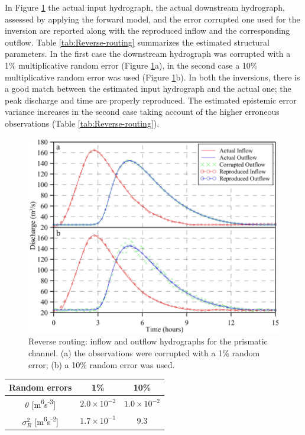 \documentclass[11pt,oneside,onecolumn]{usgsreport}
\begin{document}
\begin{appendix}
\begin{bibunit}
In Figure \ref{fig:Reverse-routing} the actual input hydrograph,
the actual downstream hydrograph, assessed by applying the forward
model, and the error corrupted one used for the inversion are reported
along with the reproduced inflow and the corresponding outflow. Table
\ref{tab:Reverse-routing} summarizes the estimated structural parameters.
In the first case the downstream hydrograph was corrupted with a 1\%
multiplicative random error (Figure \ref{fig:Reverse-routing}a),
in the second case a 10\% multiplicative random error was used (Figure
\ref{fig:Reverse-routing}b). In both the inversions, there is a good
match between the estimated input hydrograph and the actual one; the
peak discharge and time are properly reproduced. The estimated epistemic
error variance increases in the second case taking account of the
higher erroneous observations (Table \ref{tab:Reverse-routing}).

\begin{figure}[!t]
\noindent \begin{centering}
\includegraphics[scale=0.9]{figures/Reverse_Routing}
\par\end{centering}

\caption{\label{fig:Reverse-routing}Reverse routing: inflow and outflow hydrographs
for the prismatic channel. (a) the observations were corrupted with
a 1\% random error; (b) a 10\% random error was used.  }
\end{figure}


\begin{table}[!t]
\noindent \begin{centering}
\begin{tabular}{ccc}
\hline 
Random errors & 1\% & 10\%\tabularnewline
\hline 
$\theta$ {[}m\textsuperscript{6}s\textsuperscript{-3}{]} & $2.0\times10^{-2}$ & $1.0\times10^{-2}$\tabularnewline
\hline 
$\sigma_{R}^{2}$ {[}m\textsuperscript{6}s\textsuperscript{-2}{]} & $1.7\times10^{-1}$ & $9.3$\tabularnewline
\hline 
\end{tabular}
\par\end{centering}


\end{table}
\end{bibunit}
\end{appendix}
\end{document}
